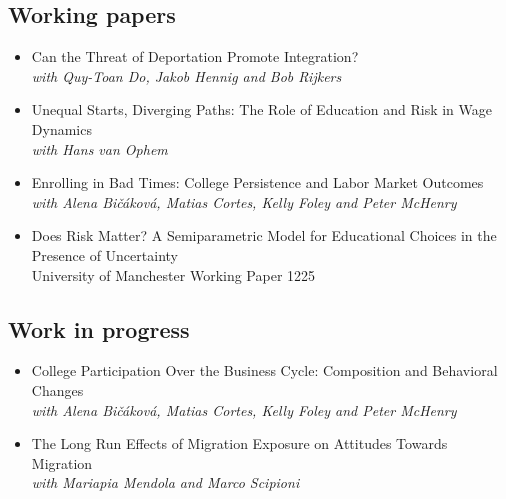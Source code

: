 \documentclass[11pt]{article}
\begin{document}
\renewcommand\refname{}
\vspace{-.9cm}



\vspace{-.3cm}

\subsection*{\sc Working papers}

\begin{itemize}[itemsep=0pt, leftmargin=20pt]
\item[-]{Can the Threat of Deportation Promote Integration?}\\
    \emph{with Quy-Toan Do, Jakob Hennig and Bob Rijkers} 
\item[-]{Unequal Starts, Diverging Paths: The Role of Education and Risk in Wage Dynamics}\\
    \emph{with Hans van Ophem}
\item[-]{Enrolling in Bad Times: College Persistence and Labor Market Outcomes}\\
	\emph{with Alena Bi\v{c}\'{a}kov\'{a}, Matias Cortes, Kelly Foley and Peter McHenry} 
\item [-]Does Risk Matter? A Semiparametric Model for Educational Choices in the Presence of Uncertainty \\
University of Manchester Working Paper 1225

\end{itemize}

\subsection*{\sc Work in progress}

\begin{itemize}[itemsep=0pt, leftmargin=20pt]
\item [-]College Participation Over the Business Cycle: Composition and Behavioral Changes\\
\emph{with Alena Bi\v{c}\'{a}kov\'{a}, Matias Cortes, Kelly Foley and Peter McHenry}
\item [-]{The Long Run Effects of Migration Exposure on Attitudes Towards Migration}\\
\emph{with Mariapia Mendola and Marco Scipioni}
\end{itemize}
\end{document}
